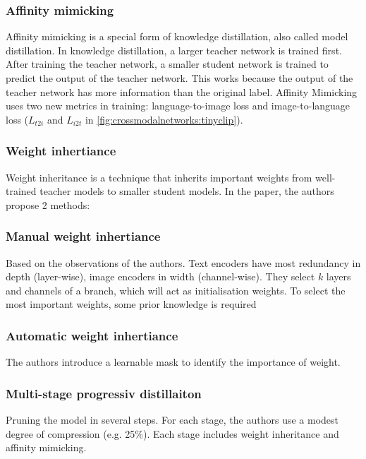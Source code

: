         \subsubsection{Affinity mimicking}
        Affinity mimicking is a special form of knowledge distillation, also called model distillation.
        In knowledge distillation, a larger teacher network is trained first.
        After training the teacher network, a smaller student network is trained to predict the output of the teacher network.
        This works because the output of the teacher network has more information than the original label.
        Affinity Mimicking uses two new metrics in training: language-to-image loss and image-to-language loss (\(L_{t2i}\) and \(L_{i2t}\) in \cref{fig:crossmodalnetworks:tinyclip}).

        \subsubsection{Weight inhertiance}
        Weight inheritance is a technique that inherits important weights from well-trained teacher models to smaller student models.
        In the paper, the authors propose 2 methods:

        \subsubsection{Manual weight inhertiance}
        Based on the observations of the authors.
        Text encoders have most redundancy in depth (layer-wise), image encoders in width (channel-wise).
        They select \(k\) layers and channels of a branch, which will act as initialisation weights.
        To select the most important weights, some prior knowledge is required

        \subsubsection{Automatic weight inhertiance}
        The authors introduce a learnable mask to identify the importance of weight.

        \subsubsection{Multi-stage progressiv distillaiton}
        Pruning the model in several steps.
        For each stage, the authors use a modest degree of compression (e.g. 25\%). Each stage includes weight inheritance and affinity mimicking.

